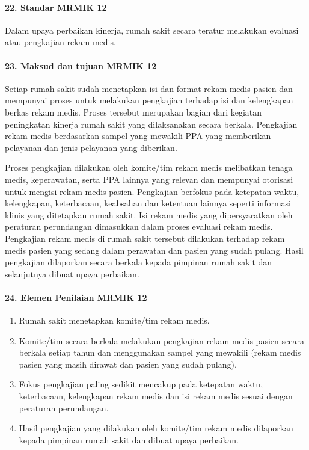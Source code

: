 \documentclass[
]{book}
\providecommand{\tightlist}{%
  \setlength{\itemsep}{0pt}\setlength{\parskip}{0pt}}
\begin{document}
\hypertarget{standar-mrmik-12}{%
\paragraph*{22. Standar MRMIK 12}\label{standar-mrmik-12}}

Dalam upaya perbaikan kinerja, rumah sakit secara teratur melakukan evaluasi atau pengkajian rekam medis.

\hypertarget{maksud-dan-tujuan-mrmik-12}{%
\paragraph*{23. Maksud dan tujuan MRMIK 12}\label{maksud-dan-tujuan-mrmik-12}}

Setiap rumah sakit sudah menetapkan isi dan format rekam medis pasien dan mempunyai proses untuk melakukan pengkajian terhadap isi dan kelengkapan berkas rekam medis. Proses tersebut merupakan bagian dari kegiatan peningkatan kinerja rumah sakit yang dilaksanakan secara berkala. Pengkajian rekam medis berdasarkan sampel yang mewakili PPA yang memberikan pelayanan dan jenis pelayanan yang diberikan.

Proses pengkajian dilakukan oleh komite/tim rekam medis melibatkan tenaga medis, keperawatan, serta PPA lainnya yang relevan dan mempunyai otorisasi untuk mengisi rekam medis pasien. Pengkajian berfokus pada ketepatan waktu, kelengkapan, keterbacaan, keabsahan dan ketentuan lainnya seperti informasi klinis yang ditetapkan rumah sakit. Isi rekam medis yang dipersyaratkan oleh peraturan perundangan dimasukkan dalam proses evaluasi rekam medis. Pengkajian rekam medis di rumah sakit tersebut dilakukan terhadap rekam medis pasien yang sedang dalam perawatan dan pasien yang sudah pulang. Hasil pengkajian dilaporkan secara berkala kepada pimpinan rumah sakit dan selanjutnya dibuat upaya perbaikan.

\hypertarget{elemen-penilaian-mrmik-12}{%
\paragraph*{24. Elemen Penilaian MRMIK 12}\label{elemen-penilaian-mrmik-12}}

\begin{enumerate}
\def\labelenumi{\alph{enumi}.}
\tightlist
\item
  Rumah sakit menetapkan komite/tim rekam medis.
\item
  Komite/tim secara berkala melakukan pengkajian rekam medis pasien secara berkala setiap tahun dan menggunakan sampel yang mewakili (rekam medis pasien yang masih dirawat dan pasien yang sudah pulang).
\item
  Fokus pengkajian paling sedikit mencakup pada ketepatan waktu, keterbacaan, kelengkapan rekam medis dan isi rekam medis sesuai dengan peraturan perundangan.
\item
  Hasil pengkajian yang dilakukan oleh komite/tim rekam medis dilaporkan kepada pimpinan rumah sakit dan dibuat upaya perbaikan.
\end{enumerate}
\end{document}
